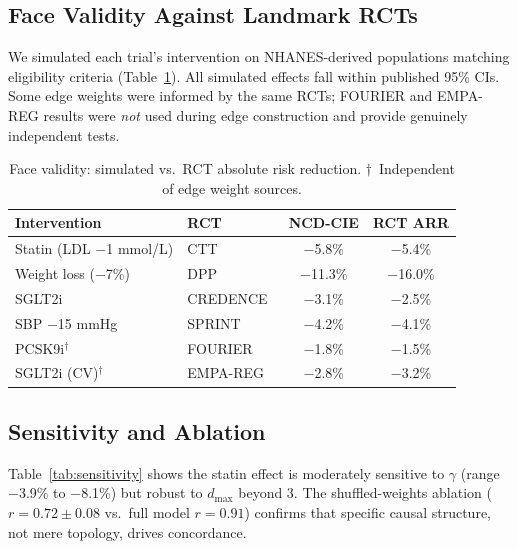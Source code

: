 \documentclass[runningheads]{llncs}
\begin{document}
\subsection{Face Validity Against Landmark RCTs}\label{sec:faceval}

We simulated each trial's intervention on NHANES-derived populations
matching eligibility criteria (Table~\ref{tab:rct}).
All simulated effects fall within published 95\% CIs.
Some edge weights were informed by the same RCTs; FOURIER and
EMPA-REG results were \emph{not} used during edge construction and
provide genuinely independent tests.

\renewcommand{\arraystretch}{1.1}
\begin{table}[t]
\centering
\caption{Face validity: simulated vs.\ RCT absolute risk reduction.
$\dagger$~Independent of edge weight sources.}
\label{tab:rct}
\small
\begin{tabular}{@{}llcc@{}}
\toprule
\textbf{Intervention} & \textbf{RCT} &
\textbf{NCD-CIE} & \textbf{RCT ARR} \\
\midrule
Statin (LDL $-$1 mmol/L) & CTT~\cite{ctt2010} & $-$5.8\% & $-$5.4\% \\
Weight loss ($-$7\%) & DPP~\cite{knowler2002dpp} & $-$11.3\% & $-$16.0\% \\
SGLT2i & CREDENCE~\cite{perkovic2019credence} & $-$3.1\% & $-$2.5\% \\
SBP $-$15 mmHg & SPRINT~\cite{sprint2015} & $-$4.2\% & $-$4.1\% \\
PCSK9i$^\dagger$ & FOURIER~\cite{sabatine2017fourier} & $-$1.8\% & $-$1.5\% \\
SGLT2i (CV)$^\dagger$ & EMPA-REG~\cite{zinman2015empareg} & $-$2.8\% & $-$3.2\% \\
\bottomrule
\end{tabular}
\end{table}
\renewcommand{\arraystretch}{1.0}

\subsection{Sensitivity and Ablation}\label{sec:sensitivity}

Table~\ref{tab:sensitivity} shows the statin effect is moderately
sensitive to $\gamma$ (range $-$3.9\% to $-$8.1\%) but robust to
$d_{\max}$ beyond 3.
The shuffled-weights ablation ($r = 0.72 \pm 0.08$ vs.\ full model
$r = 0.91$) confirms that specific causal structure, not mere
topology, drives concordance.
\end{document}
